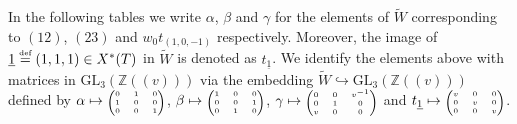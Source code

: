 \documentclass[oneside,a4paper,english, 11pt]{amsart}
\theoremstyle{plain}
\theoremstyle{plain}
\theoremstyle{plain}
\theoremstyle{plain}
\theoremstyle{plain}
\theoremstyle{plain}
\theoremstyle{definition}
\theoremstyle{definition}
\theoremstyle{definition}
\theoremstyle{remark}
\numberwithin{equation}{section}
\newcommand{\Z}{\mathbb{Z}}
\newcommand{\GL}{\mathrm{GL}}
\newcommand{\un}[1]{\underline{#1}}
\newcommand{\tld}[1]{\widetilde{#1}}
\newcommand{\defeq}{\stackrel{\textrm{\tiny{def}}}{=}}
\newcommand{\into}{\hookrightarrow}
\begin{document}
In the following tables we write $\alpha$, $\beta$ and $\gamma$ for the elements of $\tld{W}$ corresponding to $(12)$, $(23)$ and $w_0t_{(1,0,-1)}$ respectively.
Moreover, the image of $\un{1}\defeq (1,1,1)\in X^*(T)$ in $\tld{W}$ is denoted as $t_{\un{1}}$.
We identify the elements above with matrices in $\GL_3(\Z(\!(v)\!))$ via the embedding $\tld{W}\into \GL_3(\Z(\!(v)\!))$ defined by 
$\alpha\mapsto \text{\tiny{$\begin{pmatrix}0&1&0\\1&0&0\\0&0&1\end{pmatrix}$}}$, $\beta\mapsto \text{\tiny{$\begin{pmatrix}1&0&0\\0&0&1\\0&1&0\end{pmatrix}$}}$, $\gamma\mapsto \text{\tiny{$\begin{pmatrix}0&0&v^{-1}\\0&1&0\\v&0&0\end{pmatrix}$}}$ and $t_{\un{1}}\mapsto \text{\tiny{$\begin{pmatrix}v&0&0\\0&v&0\\0&0&v\end{pmatrix}$}}$.
\end{document}
